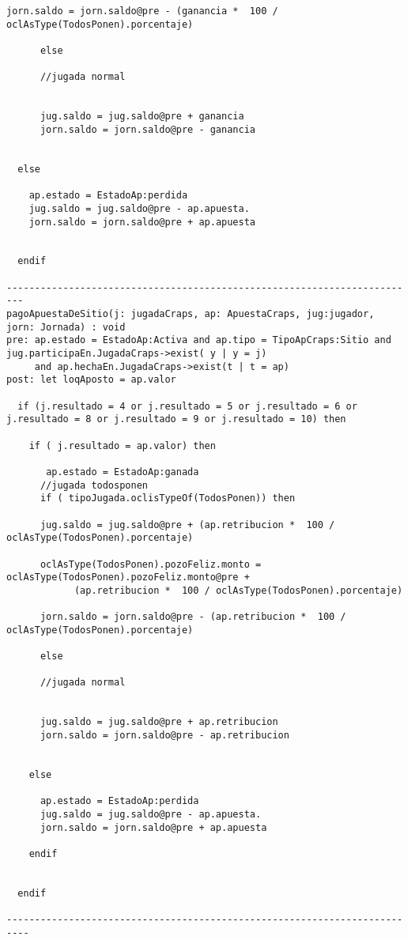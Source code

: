 \begin{framed}
\begin{lstlisting}[breaklines=true]
      jorn.saldo = jorn.saldo@pre - (ganancia *  100 / oclAsType(TodosPonen).porcentaje)

      else

      //jugada normal


      jug.saldo = jug.saldo@pre + ganancia
      jorn.saldo = jorn.saldo@pre - ganancia  


  else 
    
    ap.estado = EstadoAp:perdida
    jug.saldo = jug.saldo@pre - ap.apuesta.
    jorn.saldo = jorn.saldo@pre + ap.apuesta
    
  
  endif

-------------------------------------------------------------------------
pagoApuestaDeSitio(j: jugadaCraps, ap: ApuestaCraps, jug:jugador, jorn: Jornada) : void
pre: ap.estado = EstadoAp:Activa and ap.tipo = TipoApCraps:Sitio and jug.participaEn.JugadaCraps->exist( y | y = j) 
     and ap.hechaEn.JugadaCraps->exist(t | t = ap)
post: let loqAposto = ap.valor

  if (j.resultado = 4 or j.resultado = 5 or j.resultado = 6 or j.resultado = 8 or j.resultado = 9 or j.resultado = 10) then

    if ( j.resultado = ap.valor) then
      
       ap.estado = EstadoAp:ganada
      //jugada todosponen
      if ( tipoJugada.oclisTypeOf(TodosPonen)) then 
    
      jug.saldo = jug.saldo@pre + (ap.retribucion *  100 / oclAsType(TodosPonen).porcentaje)
    
      oclAsType(TodosPonen).pozoFeliz.monto = oclAsType(TodosPonen).pozoFeliz.monto@pre + 
            (ap.retribucion *  100 / oclAsType(TodosPonen).porcentaje)

      jorn.saldo = jorn.saldo@pre - (ap.retribucion *  100 / oclAsType(TodosPonen).porcentaje)

      else

      //jugada normal


      jug.saldo = jug.saldo@pre + ap.retribucion
      jorn.saldo = jorn.saldo@pre - ap.retribucion

 
    else
      
      ap.estado = EstadoAp:perdida
      jug.saldo = jug.saldo@pre - ap.apuesta.
      jorn.saldo = jorn.saldo@pre + ap.apuesta

    endif


  endif

--------------------------------------------------------------------------



\end{lstlisting}
\end{framed}
